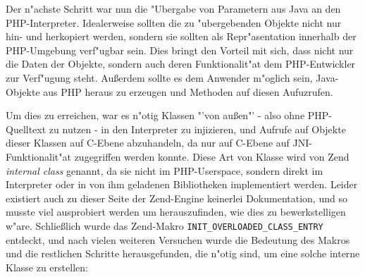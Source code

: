 Der n"achste Schritt war nun die "Ubergabe von Parametern aus Java an den PHP-Interpreter. Idealerweise sollten die zu "ubergebenden
Objekte nicht nur hin- und herkopiert werden, sondern sie sollten als Repr"asentation innerhalb der PHP-Umgebung verf"ugbar sein.
Dies bringt den Vorteil mit sich, dass nicht nur die Daten der Objekte, sondern auch deren Funktionalit"at dem PHP-Entwickler zur
Verf"ugung steht. Au\ss erdem sollte es dem Anwender m"oglich sein, Java-Objekte aus PHP heraus zu erzeugen und Methoden auf diesen
Aufuzrufen.

Um dies zu erreichen, war es n"otig Klassen "'von au\ss en"' - also ohne PHP-Quelltext zu nutzen - in den Interpreter zu injizieren,
und Aufrufe auf Objekte dieser Klassen auf C-Ebene abzuhandeln, da nur auf C-Ebene auf JNI-Funktionalit"at zugegriffen werden konnte. 
Diese Art von Klasse wird von Zend \emph{internal class} genannt, da sie nicht im PHP-Userspace, sondern direkt im Interpreter oder in von
ihm geladenen Bibliotheken implementiert werden.
Leider existiert auch zu dieser Seite der Zend-Engine keinerlei Dokumentation, und so musste viel ausprobiert werden um
herauszufinden, wie dies zu bewerkstelligen w"are. Schlie\ss lich wurde das Zend-Makro \texttt{INIT\_OVERLOADED\_CLASS\_ENTRY} entdeckt,
und nach vielen weiteren Versuchen wurde die Bedeutung des Makros und die restlichen Schritte herausgefunden, die n"otig
sind, um eine solche interne Klasse zu erstellen:

